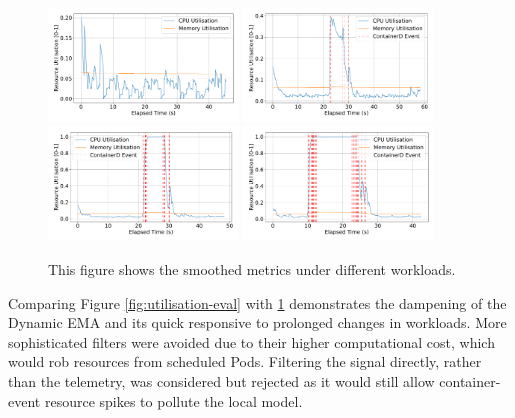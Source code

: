 \begin{figure}[H]
    \centering
    \includegraphics[width=0.45\textwidth]{images/filter-utilisation-baseline.pdf}
    \includegraphics[width=0.45\textwidth]{images/filter-utilisation-single.pdf} \\
    \includegraphics[width=0.45\textwidth]{images/filter-utilisation-smallbatch.pdf}
    \includegraphics[width=0.45\textwidth]{images/filter-utilisation-bigbatch.pdf}
    \caption{This figure shows the smoothed metrics under different workloads.}
    \label{fig:filtered-metrics-eval}
\end{figure}

Comparing Figure \ref{fig:utilisation-eval} with \ref{fig:filtered-metrics-eval}
demonstrates the dampening of the Dynamic EMA and its quick responsive to
prolonged changes in workloads. More sophisticated filters were avoided due to
their higher computational cost, which would rob resources from scheduled Pods.
Filtering the signal directly, rather than the telemetry, was considered but
rejected as it would still allow container-event resource spikes to pollute the
local model.

